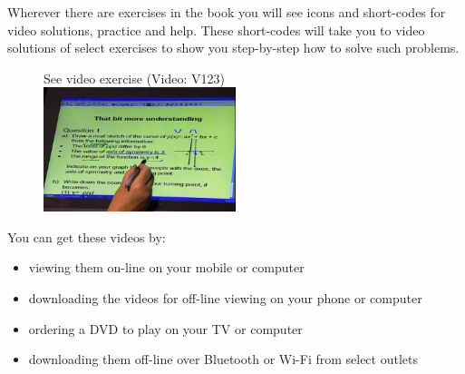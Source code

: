{

Wherever there are exercises in the book you will see icons and short-codes for video solutions,
practice and help. These short-codes will take you to video solutions of select exercises to show you
step-by-step how to solve such problems. \par

\begin{figure}[h]
\begin{center}
See video exercise  (Video: V123)\\ 
\includegraphics[width=0.5\textwidth]{title_images/mindsetexercise.png}
\end{center}
\end{figure}
You can get these videos by:
\begin{itemize}
    \item viewing them on-line on your mobile or computer
    \item downloading the videos for off-line viewing on your phone or computer
    \item ordering a DVD to play on your TV or computer
    \item downloading them off-line over Bluetooth or Wi-Fi from select outlets
\end{itemize}
}


